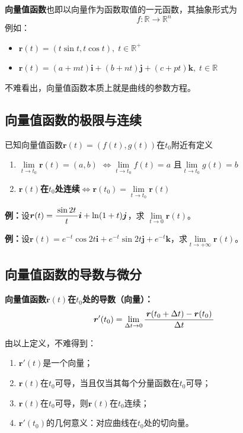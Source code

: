 {\bf 向量值函数}也即以向量作为函数取值的一元函数，其抽象形式为
$$f:\mathbb{R}\to\mathbb{R}^n$$
例如：
\begin{itemize}
  \item $\bm{r}(t)=(t\sin t, t\cos t),\;t\in\mathbb{R}^+$ 
  \item
  $\bm{r}(t)=(a+mt)\bm{i}+(b+nt)\bm{j}+(c+pt)\bm{k},\;t\in\mathbb{R}$ 
\end{itemize}

不难看出，{\kaishu 向量值函数本质上就是曲线的参数方程}。

\subsection{向量值函数的极限与连续}

\begin{thx}
	已知向量值函数$\bm{r}(t)=(f(t),g(t))$在$t_0$附近有定义 
	\begin{enumerate}[(1)]
	  \item {\bf $\lim\limits_{t\to t_0}\bm{r}(t)=(a,b)$}
	  $\Leftrightarrow\lim\limits_{t\to t_0}f(t)=a$
	  且$\lim\limits_{t\to t_0}g(t)=b$
	  \item {\bf $\bm{r}(t)$在$t_0$处连续}$\Leftrightarrow
	  \bm{r}(t_0)=\lim\limits_{t\to t_0}\bm{r}(t)$
	\end{enumerate}
\end{thx}

{\bf 例：}设$\bm{r}(t)=\displaystyle\frac{\,{\sin 2t}\,}{\,{t}\,}\bm{i}+\ln(1+t)\bm{j}$，求
$\lim\limits_{t\to 0}\bm{r}(t)$。

{\bf 例：}设$\bm{r}(t)=e^{-t}\cos 2t\bm{i}+e^{-t}\sin 2t
\bm{j}+e^{-t}\bm{k}$，求$\lim\limits_{t\to +\infty}\bm{r}(t)$。

\subsection{向量值函数的导数与微分}

\begin{thx}
	{\bf 向量值函数$\bm{r}(t)$在$t_0$处的导数（向量）：}
	$$\bm{r}'(t_0)=\lim\limits_{\Delta t\to 0}
	\displaystyle\frac{\,{\bm{r}(t_0+\Delta t)-\bm{r}(t_0)}\,}{\,{\Delta t}\,}$$
\end{thx}

由以上定义，不难得到：
\begin{enumerate}
  \setlength{\itemindent}{1cm}
  \item $\bm{r}'(t)$是一个向量；
  \item $\bm{r}(t)$在$t_0$可导，当且仅当其每个分量函数在$t_0$可导；
  \item $\bm{r}(t)$在$t_0$可导，则$\bm{r}(t)$在$t_0$连续；
  \item $\bm{r}'(t_0)$的几何意义：对应曲线在$t_0$处的切向量。
\end{enumerate}

